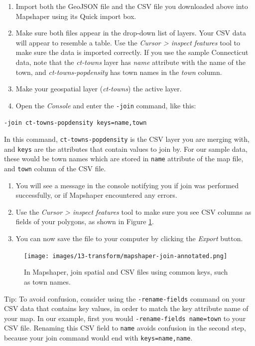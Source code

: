 \documentclass[
  english,
]{book}
\begin{document}
\begin{enumerate}
\def\labelenumi{\arabic{enumi}.}
\item
  Import both the GeoJSON file and the CSV file you downloaded above into Mapshaper using its Quick import box.
\item
  Make sure both files appear in the drop-down list of layers.
  Your CSV data will appear to resemble a table. Use the \emph{Cursor \textgreater{} inspect features} tool
  to make sure the data is imported correctly. If you use the sample Connecticut data, note that the \emph{ct-towns} layer
  has \emph{name} attribute with the name of the town, and \emph{ct-towns-popdensity} has town names in the \emph{town} column.
\item
  Make your geospatial layer (\emph{ct-towns}) the active layer.
\item
  Open the \emph{Console} and enter the \texttt{-join} command, like this:
\end{enumerate}

\texttt{-join\ ct-towns-popdensity\ keys=name,town}

In this command, \texttt{ct-towns-popdensity} is the CSV layer you are merging with, and \texttt{keys} are the attributes that contain values to join by.
For our sample data, these would be town names which are stored in \texttt{name} attribute of the map file, and \texttt{town} column
of the CSV file.

\begin{enumerate}
\def\labelenumi{\arabic{enumi}.}
\setcounter{enumi}{4}
\item
  You will see a message in the console notifying you if join was performed successfully, or if Mapshaper encountered any errors.
\item
  Use the \emph{Cursor \textgreater{} inspect features} tool to make sure you see CSV columns as fields of your polygons, as shown in Figure \ref{fig:mapshaper-join}.
\item
  You can now save the file to your computer by clicking the \emph{Export} button.
\end{enumerate}



\begin{figure}
\centering
\texttt{[image: images/13-transform/mapshaper-join-annotated.png]}
\caption{\label{fig:mapshaper-join}In Mapshaper, join spatial and CSV files using common keys, such as town names.}
\end{figure}

Tip: To avoid confusion, consider using the \texttt{-rename-fields} command on your CSV data that contains key values, in order to match the key attribute name of your map.
In our example, first you would \texttt{-rename-fields\ name=town} to your CSV file. Renaming this CSV field to \texttt{name} avoids confusion in the second step, because your join command would end with \texttt{keys=name,name}.
\end{document}
